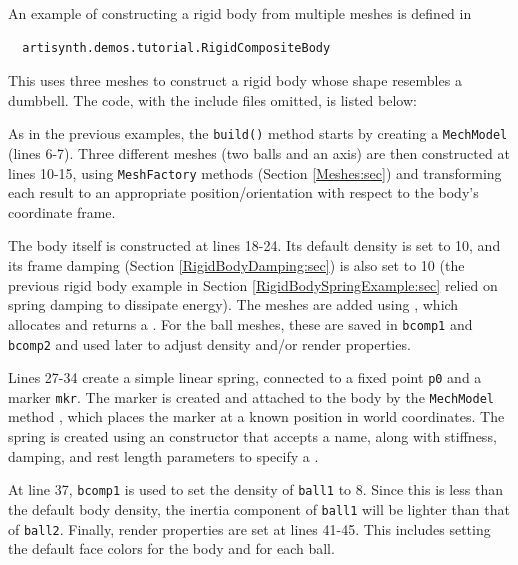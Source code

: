 An example of constructing a rigid body from multiple meshes is
defined in
%
\begin{verbatim}
  artisynth.demos.tutorial.RigidCompositeBody
\end{verbatim}
%
This uses three meshes to construct a rigid
body whose shape resembles a dumbbell. The code, with the include
files omitted, is listed below:
\lstset{numbers=left}
\iflatexml

\else

\fi
\lstset{numbers=none}

As in the previous examples, the {\tt build()} method starts by
creating a {\tt MechModel} (lines 6-7). Three different meshes
(two balls and an axis) are then constructed at lines 10-15,
using {\tt MeshFactory} methods (Section \ref{Meshes:sec})
and transforming each result to an appropriate position/orientation with
respect to the body's coordinate frame.

The body itself is constructed at lines 18-24. Its default density is
set to 10, and its frame damping (Section \ref{RigidBodyDamping:sec})
is also set to 10 (the previous rigid body example in Section 
\ref{RigidBodySpringExample:sec} relied on spring damping to dissipate energy).
The meshes are added using
,
which allocates and returns a 
. For the ball meshes,
these are saved in {\tt bcomp1} and {\tt bcomp2} and used later to
adjust density and/or render properties.

Lines 27-34 create a simple linear spring, connected to a fixed point
{\tt p0} and a marker {\tt mkr}. The marker is created and attached to
the body by the {\tt MechModel} method
, which places the
marker at a known position in world coordinates.  The spring is
created using an  constructor that
accepts a name, along with stiffness, damping, and rest length
parameters to specify a
.

At line 37, {\tt bcomp1} is used to set the density of {\tt ball1} to
8. Since this is less than the default body density, the inertia
component of {\tt ball1} will be lighter than that of {\tt ball2}.
Finally, render properties are set at lines 41-45. This includes
setting the default face colors for the body and for each ball.

